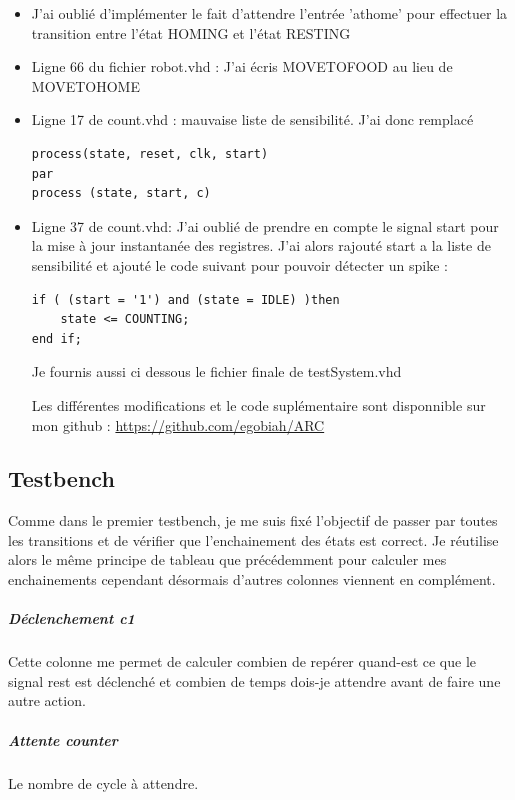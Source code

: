 \documentclass{article}
\begin{document}
\begin{itemize}

\item J'ai oublié d'implémenter le fait d'attendre l'entrée 'athome' pour effectuer la transition entre l'état HOMING et l'état RESTING


\item
Ligne 66 du fichier robot.vhd : J'ai écris MOVETOFOOD au lieu de MOVETOHOME


\item
Ligne 17 de count.vhd : mauvaise liste de sensibilité. J'ai donc remplacé 
\begin{verbatim}
process(state, reset, clk, start)
par
process (state, start, c) 
\end{verbatim}

\item
Ligne 37 de count.vhd: J'ai oublié de prendre en compte le signal start pour la mise à jour instantanée des registres. J'ai alors rajouté start a la liste de sensibilité et ajouté le code suivant pour pouvoir détecter un spike :

\begin{verbatim}
if ( (start = '1') and (state = IDLE) )then
	state <= COUNTING;
end if;
\end{verbatim}

Je fournis aussi ci dessous le fichier finale de testSystem.vhd 

Les différentes modifications et le code suplémentaire sont disponnible sur mon github : \url{https://github.com/egobiah/ARC}


\end{itemize}

\subsection{Testbench}
Comme dans le premier testbench, je me suis fixé l'objectif de passer par toutes les transitions et de vérifier que l'enchainement des états est correct. 
\vspace{5mm}
Je réutilise alors le même principe de tableau que précédemment pour calculer mes enchainements cependant désormais d'autres colonnes viennent en complément.

\subparagraph{Déclenchement c1} Cette colonne me permet de calculer  combien de repérer quand-est ce que le signal rest est déclenché et combien de temps dois-je attendre avant de faire une autre action.

\subparagraph{Attente counter} Le nombre de cycle à attendre.
\end{document}
